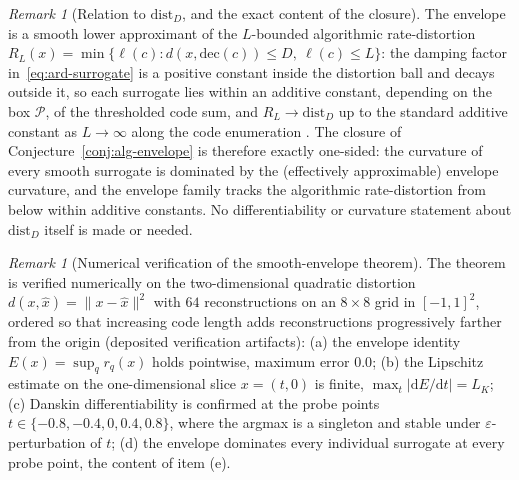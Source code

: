 \documentclass[11pt,a4paper]{article}
\theoremstyle{plain}
\theoremstyle{definition}
\theoremstyle{remark}
\newtheorem{remark}[theorem]{Remark}
\newcommand{\distD}{\mathrm{dist}_{D}}
\begin{document}
\begin{remark}[Relation to $\distD$, and the exact content of the
closure]\label{rem:envelope-distD}
The envelope is a smooth lower approximant of the $L$-bounded
algorithmic rate-distortion $R_L(x) = \min\{\ell(c) : d(x,
\mathrm{dec}(c)) \le D,\ \ell(c) \le L\}$: the damping factor
in~\eqref{eq:ard-surrogate} is a positive constant inside the
distortion ball and decays outside it, so each surrogate lies within
an additive constant, depending on the box $\mathcal{P}$, of the
thresholded code sum, and $R_L \to \distD$ up to the standard
additive constant as $L \to \infty$ along the code enumeration
\citep{vereshchagin2010rate}. The closure of
Conjecture~\ref{conj:alg-envelope} is therefore exactly one-sided:
the curvature of every smooth surrogate is dominated by the
(effectively approximable) envelope curvature, and the envelope
family tracks the algorithmic rate-distortion from below within
additive constants. No differentiability or curvature statement
about $\distD$ itself is made or needed.
\end{remark}

\begin{remark}[Numerical verification of the smooth-envelope
theorem]\label{rem:smooth-envelope-numeric}
The theorem is verified numerically on the two-dimensional quadratic
distortion $d(x, \hat x) = \|x - \hat x\|^2$ with $64$
reconstructions on an $8 \times 8$ grid in $[-1,1]^2$, ordered so
that increasing code length adds reconstructions progressively
farther from the origin (deposited verification artifacts): (a) the
envelope identity $E(x) = \sup_q r_q(x)$ holds pointwise, maximum
error $0.0$; (b) the Lipschitz estimate on the one-dimensional slice
$x = (t, 0)$ is finite, $\max_t|\mathrm{d}E/\mathrm{d}t| = L_K$;
(c) Danskin differentiability is confirmed at the probe points
$t \in \{-0.8, -0.4, 0, 0.4, 0.8\}$, where the argmax is a singleton
and stable under $\varepsilon$-perturbation of $t$; (d) the envelope
dominates every individual surrogate at every probe point, the
content of item (e).
\end{remark}
\end{document}
